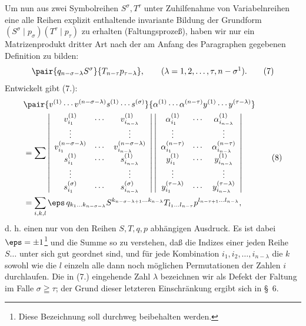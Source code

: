 Um nun aus zwei Symbolreihen $S^\sigma,T^\tau$ unter Zuhilfenahme von Variabelnreihen eine alle Reihen explizit enthaltende invariante Bildung der Grundform $(S^\sigma\mid p_\sigma)(T^\tau\mid p_\tau)$ zu erhalten (Faltungsprozeß), haben wir nur ein Matrizenprodukt dritter Art nach der am Anfang des Paragraphen gegebenen Definition zu bilden:
\begin{equation}
 \pair{q_{n-\sigma-\lambda}S^\sigma}{T_{n-\tau}p_{\tau-\lambda}},
 \qquad (\lambda=1,2,\ldots,\tau,n-\sigma\footnotemark).
\tag{7}
\end{equation}
Entwickelt gibt (7.):
\begingroup
\setlength{\arraycolsep}{2pt}
\begin{equation}
\begin{aligned}
&\pair{v^{(1)}\cdots v^{(n-\sigma-\lambda)}s^{(1)}\cdots s^{(\sigma)}}
       {\alpha^{(1)}\cdots\alpha^{(n-\tau)}y^{(1)}\cdots y^{(\tau-\lambda)}} \\
&=\sum
\left|\begin{array}{ccc}
 v_{i_1}^{(1)}&\cdots&v_{i_{n-\lambda}}^{(1)}\\
 \vdots&&\vdots\\
 v_{i_1}^{(n-\sigma-\lambda)}&\cdots&v_{i_{n-\lambda}}^{(n-\sigma-\lambda)}\\
 s_{i_1}^{(1)}&\cdots&s_{i_{n-\lambda}}^{(1)}\\
 \vdots&&\vdots\\
 s_{i_1}^{(\sigma)}&\cdots&s_{i_{n-\lambda}}^{(\sigma)}
\end{array}\right|
\left|\begin{array}{ccc}
 \alpha_{i_1}^{(1)}&\cdots&\alpha_{i_{n-\lambda}}^{(1)}\\
 \vdots&&\vdots\\
 \alpha_{i_1}^{(n-\tau)}&\cdots&\alpha_{i_{n-\lambda}}^{(n-\tau)}\\
 y_{i_1}^{(1)}&\cdots&y_{i_{n-\lambda}}^{(1)}\\
 \vdots&&\vdots\\
 y_{i_1}^{(\tau-\lambda)}&\cdots&y_{i_{n-\lambda}}^{(\tau-\lambda)}
\end{array}\right|\\
&=\sum_{i,k,l}\eps\,q_{k_1\ldots k_{n-\sigma-\lambda}}
 S^{k_{n-\sigma-\lambda+1}\ldots k_{n-\lambda}}
 T_{l_1\ldots l_{n-\tau}}
 p^{l_{n-\tau+1}\ldots l_{n-\lambda}},
\end{aligned}
\tag{8}
\end{equation}
\endgroup
d. h. einen nur von den Reihen $S,T,q,p$ abhängigen Ausdruck. Es ist dabei $\eps=\pm1$\footnote{Diese Bezeichnung soll durchweg beibehalten werden.} und die Summe so zu verstehen, daß die Indizes einer jeden Reihe $S\ldots$ unter sich gut geordnet sind, und für jede Kombination $i_1,i_2,\ldots,i_{n-\lambda}$ die $k$ sowohl wie die $l$ einzeln alle dann noch möglichen Permutationen der Zahlen $i$ durchlaufen. Die in (7.) eingehende Zahl $\lambda$ bezeichnen wir als Defekt der Faltung im Falle $\sigma\geqq\tau$; der Grund dieser letzteren Einschränkung ergibt sich in \S\ 6.
